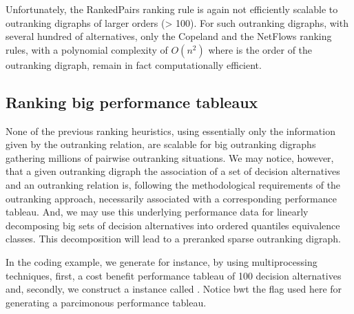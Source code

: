 \documentclass[a4paper,10pt,english]{sphinxhowto}
\begin{document}
Unfortunately, the Ranked\sphinxhyphen{}Pairs ranking rule is again not efficiently scalable to outranking digraphs of larger orders (\textgreater{} 100). For such outranking digraphs, with several hundred of alternatives, only the Copeland and the Net\sphinxhyphen{}Flows ranking rules, with a polynomial complexity of \(O(n^2)\) where  is the order of the outranking digraph, remain in fact computationally efficient.


\subsection{Ranking big performance tableaux}
\label{\detokenize{tutorial:ranking-big-performance-tableaux}}
None of the previous ranking heuristics, using essentially only the information given by the outranking relation, are scalable for big outranking digraphs gathering millions of pairwise outranking situations. We may notice, however, that a given outranking digraph \sphinxhyphen{}the association of a set of decision alternatives and an outranking relation\sphinxhyphen{} is, following the methodological requirements of the outranking approach, necessarily associated with a corresponding performance tableau. And, we may use this underlying performance data for linearly decomposing big sets of decision alternatives into ordered quantiles equivalence classes. This decomposition will lead to a pre\sphinxhyphen{}ranked sparse outranking digraph.

In the coding example, we generate for instance, by using multiprocessing techniques, first, a cost benefit performance tableau of 100 decision alternatives and, secondly, we construct a  instance called . Notice bwt the  flag used here for generating a parcimonous performance tableau.
\end{document}
